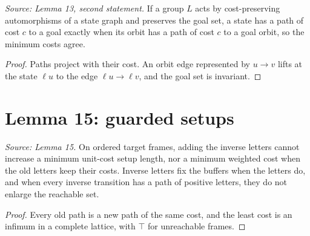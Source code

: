 \begin{theorem}
  \label{thm:symmetry-quotient}
  \leanok
  \textit{Source: Lemma 13, second statement.}
  If a group \(L\) acts by cost-preserving automorphisms of a state graph
  and preserves the goal set, a state has a path of cost \(c\) to a goal
  exactly when its orbit has a path of cost \(c\) to a goal orbit, so the
  minimum costs agree.
\end{theorem}
\begin{proof}
  \leanok
  Paths project with their cost. An orbit edge represented by
  \(u\to v\) lifts at the state \(\ell u\) to the edge \(\ell u\to\ell v\),
  and the goal set is invariant.
\end{proof}

\section{Lemma 15: guarded setups}

\begin{theorem}[Lemma 15]
  \label{thm:guarded-setup}
  \leanok
  \textit{Source: Lemma 15.}
  On ordered target frames, adding the inverse letters cannot increase a
  minimum unit-cost setup length, nor a minimum weighted cost when the old
  letters keep their costs. Inverse letters fix the buffers when the
  letters do, and when every inverse transition has a path of positive
  letters, they do not enlarge the reachable set.
\end{theorem}
\begin{proof}
  \leanok
  Every old path is a new path of the same cost, and the least cost is an
  infimum in a complete lattice, with \(\top\) for unreachable frames.
\end{proof}

